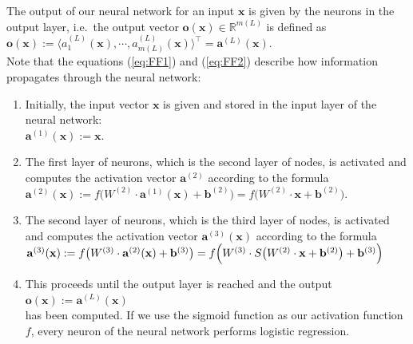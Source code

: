 The output of our neural network for an input $\mathbf{x}$ is given by the neurons in the output
layer,  i.e.~the output vector 
$\mathbf{o}(\mathbf{x}) \in \mathbb{R}^{m(L)}$ is defined as 
\\[0.2cm]
\hspace*{1.3cm}
$\mathbf{o}(\mathbf{x}) :=
 \bigl\langle a^{(L)}_1(\mathbf{x}), \cdots, a^{(L)}_{m(L)}(\mathbf{x}) \bigr\rangle^\top = \mathbf{a}^{(L)}(\mathbf{x})$.
\\[0.2cm]
Note that the equations (\ref{eq:FF1}) and (\ref{eq:FF2}) describe how information propagates
through the neural network: 
\begin{enumerate}
\item Initially, the input vector $\mathbf{x}$ is given and stored in the input layer of the neural network:
      \\[0.2cm]
      \hspace*{1.3cm}
      $\mathbf{a}^{(1)}(\mathbf{x}) := \mathbf{x}$.
\item The first layer of neurons, which is the second layer of nodes,  is activated and computes the activation
      vector $\mathbf{a}^{(2)}$ according to the formula
      \\[0.2cm]
      \hspace*{1.3cm}
      $\mathbf{a}^{(2)}(\mathbf{x}) := f\bigl(W^{(2)} \cdot \mathbf{a}^{(1)}(\mathbf{x}) + \mathbf{b}^{(2)}\bigr) = 
                                        f\bigl(W^{(2)} \cdot \mathbf{x} + \mathbf{b}^{(2)}\bigr)
      $.
\item The second layer of neurons, which is the third layer of nodes,  is activated and computes the activation
      vector $\mathbf{a}^{(3)}(\mathbf{x})$ according to the formula
      \\[0.2cm]
      \hspace*{1.3cm}
      $\mathbf{a}^{(3)}(\mathbf{x}) := f\bigl(W^{(3)} \cdot \mathbf{a}^{(2)}(\mathbf{x}) + \mathbf{b}^{(3)}\bigr)
                          = f\Bigl(W^{(3)} \cdot S\bigl(W^{(2)} \cdot \mathbf{x} + \mathbf{b}^{(2)}\bigr) + \mathbf{b}^{(3)}\Bigr)
        $
\item This proceeds until the output layer is reached and the output
      \\[0.2cm]
      \hspace*{1.3cm}
      $\mathbf{o}(\mathbf{x}) := \mathbf{a}^{(L)}(\mathbf{x})$
      \\[0.2cm]
      has been computed.  If we use the sigmoid function as our activation function $f$, every neuron of
      the neural network performs logistic regression. 
\end{enumerate}
